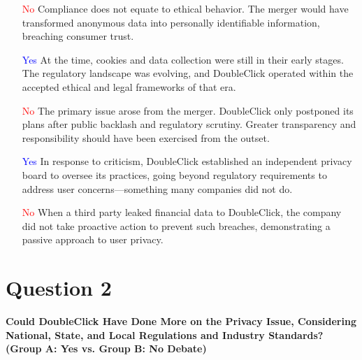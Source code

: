\documentclass[12pt]{article}
\begin{document}
\begin{itemize}
    \item [\textcolor{red}{No}] Compliance does not equate to ethical behavior. The merger would have transformed anonymous data into personally identifiable information, breaching consumer trust.  
    \item [\textcolor{blue}{Yes}] At the time, cookies and data collection were still in their early stages. The regulatory landscape was evolving, and DoubleClick operated within the accepted ethical and legal frameworks of that era.  
    \item [\textcolor{red}{No}] The primary issue arose from the merger. DoubleClick only postponed its plans after public backlash and regulatory scrutiny. Greater transparency and responsibility should have been exercised from the outset.  
    \item [\textcolor{blue}{Yes}] In response to criticism, DoubleClick established an independent privacy board to oversee its practices, going beyond regulatory requirements to address user concerns—something many companies did not do.  
    \item [\textcolor{red}{No}] When a third party leaked financial data to DoubleClick, the company did not take proactive action to prevent such breaches, demonstrating a passive approach to user privacy.  
\end{itemize}


\section*{Question 2}
\textbf{Could DoubleClick Have Done More on the Privacy Issue, Considering National, State, and Local Regulations and Industry Standards? (Group A: Yes vs. Group B: No Debate)}
\end{document}
